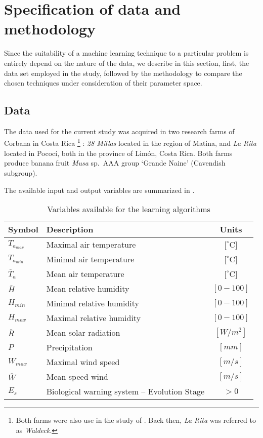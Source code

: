 \section{Specification of data and methodology}
\label{sec:data}

Since the suitability of a machine learning technique to a particular
problem is entirely depend on the nature of the data, we describe in
this section, first, the data set employed in the study, followed by
the methodology to compare the chosen techniques under consideration
of their parameter space.

\subsection{Data}

The data used for the current study was acquired in two research farms
of Corbana in Costa Rica%
%
\footnote{Both farms were also use in the study of \citet{Romero1995}.  Back
  then, \emph{La Rita} was referred to as \emph{Waldeck}.}
%
: \emph{28 Millas} located in the region of Matina, and \emph{La Rita}
located in Pococí, both in the province of Limón, Costa Rica.
%
Both farms produce banana fruit \emph{Musa} sp.\ AAA group `Grande
Naine' (Cavendish subgroup).

The available input and output variables are summarized in
.
%
\begin{table}[h] 
\centering
\begin{tabular}{l|l|c} 
\hline
\textbf{Symbol}  & \textbf{Description} & \textbf{Units} \\ 
\hline\hline 
$T_{a_{max}}$       & Maximal air temperature & $[^\circ$C$]$ \\
$T_{a_{min}}$       & Minimal air temperature & $[^\circ$C$]$ \\
$\overline{T}_{a}$ & Mean air temperature    & $[^\circ$C$]$ \\
$\overline{H}$    & Mean relative humidity           & $[0 - 100]$   \\
$H_{min}$          & Minimal relative humidity        & $[0 - 100]$  \\
$H_{max}$          & Maximal relative humidity        & $[0 - 100]$  \\
$\overline{R}$    & Mean solar radiation    & $[W/m^2]$ \\
$P$               & Precipitation       & $[mm]$ \\
$W_{max}$          & Maximal wind speed      & $[m/s]$ \\
$\overline{W}$    & Mean speed wind         & $[m/s]$ \\
\hline
$E_s$             & Biological warning system – Evolution Stage  & $>0$\\
\hline
\end{tabular} 
\caption{Variables available for the learning algorithms} 
\label{tab:variables} 
\end{table}

